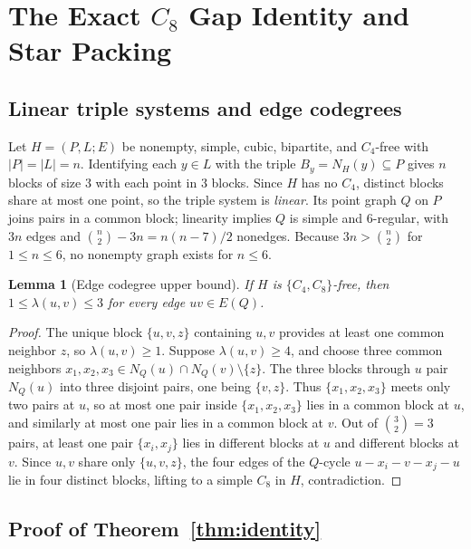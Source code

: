 \documentclass[11pt]{amsart}
\newtheorem{lemma}[theorem]{Lemma}
\theoremstyle{definition}
\theoremstyle{remark}
\begin{document}
\section{The Exact $C_8$ Gap Identity and Star Packing}

\subsection{Linear triple systems and edge codegrees}

Let $H = (P, L; E)$ be nonempty, simple, cubic, bipartite, and $C_4$-free with $|P|=|L|=n$. Identifying each $y \in L$ with the triple $B_y = N_H(y) \subseteq P$ gives $n$ blocks of size $3$ with each point in $3$ blocks. Since $H$ has no $C_4$, distinct blocks share at most one point, so the triple system is \emph{linear}. Its point graph $Q$ on $P$ joins pairs in a common block; linearity implies $Q$ is simple and $6$-regular, with $3n$ edges and $\binom{n}{2} - 3n = n(n-7)/2$ nonedges. Because $3n > \binom{n}{2}$ for $1 \le n \le 6$, no nonempty graph exists for $n \le 6$.

\begin{lemma}[Edge codegree upper bound]\label{lem:edge_lambda}
If $H$ is $\{C_4, C_8\}$-free, then $1 \le \lambda(u,v) \le 3$ for every edge $uv \in E(Q)$.
\end{lemma}

\begin{proof}
The unique block $\{u, v, z\}$ containing $u, v$ provides at least one common neighbor $z$, so $\lambda(u,v) \ge 1$. Suppose $\lambda(u,v) \ge 4$, and choose three common neighbors $x_1, x_2, x_3 \in N_Q(u) \cap N_Q(v) \setminus \{z\}$. The three blocks through $u$ pair $N_Q(u)$ into three disjoint pairs, one being $\{v, z\}$. Thus $\{x_1, x_2, x_3\}$ meets only two pairs at $u$, so at most one pair inside $\{x_1, x_2, x_3\}$ lies in a common block at $u$, and similarly at most one pair lies in a common block at $v$. Out of $\binom{3}{2} = 3$ pairs, at least one pair $\{x_i, x_j\}$ lies in different blocks at $u$ and different blocks at $v$. Since $u, v$ share only $\{u,v,z\}$, the four edges of the $Q$-cycle $u - x_i - v - x_j - u$ lie in four distinct blocks, lifting to a simple $C_8$ in $H$, contradiction.
\end{proof}

\subsection{Proof of Theorem~\ref{thm:identity}}
\end{document}
